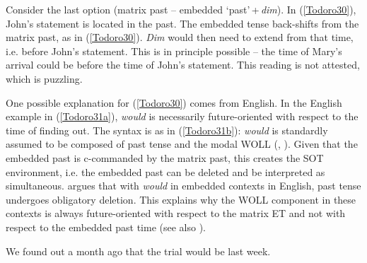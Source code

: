 \documentclass[output=paper]{langscibook}
\begin{document}
Consider the last option (matrix past -- embedded ‘past’\,+\,\emph{dim}). In (\ref{Todoro30}), John’s statement is located in the past. The embedded tense back-shifts from the matrix past, as in (\ref{Todoro30}). \emph{Dim} would then need to extend from that time, i.e. before John’s statement. This is in principle possible -- the time of Mary’s arrival could be before the time of John’s statement. This reading is not attested, which is puzzling.\largerpage[-2]

\begin{exe}\judgewidth{\#}
\ex \label{Todoro30}
\begin{xlist}


\ex[]{\label{Todoro30b}
\tsc{[tp \textit{past} [aspp [vp [cp [tp \textit{past} [modp $\emptyset$ [aspp \textbf{\textit{dim}} [vp]]]]]]]}}

\end{xlist}
\end{exe}

One possible explanation for (\ref{Todoro30}) comes from English. In the English example in (\ref{Todoro31a}), \textit{would} is necessarily future-oriented with respect to the time of finding out. The syntax is as in (\ref{Todoro31b}): \textit{would} is standardly assumed to be composed of past tense and the modal WOLL (\citealt{abusch1985a}, \citeyear{abusch1988a}). Given that the embedded past is c-commanded by the matrix past, this creates the SOT environment, i.e. the embedded past can be deleted and be interpreted as simultaneous. \citet{kusumoto1999a} argues that with \textit{would} in embedded contexts in English, past tense undergoes obligatory deletion. This explains why the WOLL component in these contexts is always future-oriented with respect to the matrix ET and not with respect to the embedded past time (see also \citealt{wurmbrand2014a}). 

\begin{exe}
\ex \label{Todoro31}
\begin{xlist}

\ex \label{Todoro31a}
We found out a month ago that the trial would be last week. 

\ex \label{Todoro31b}

\end{xlist}
\end{exe}
\end{document}
